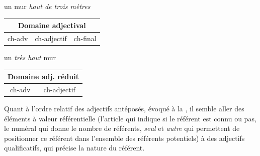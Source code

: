 {    \ea 
    \ea un mur \textit{haut de trois mètres}\\
    \begin{center}
    \def\arraystretch{1.5}
    \setlength{\tabcolsep}{4ex}
    \begin{tabular}{|c|c|c|}
    \hline
    \multicolumn{3}{|c|}{\cellcolor{lsDOIGray}Domaine adjectival}\\\hline
    ch-adv & \cellcolor{lsDOIGray} ch-adjectif & ch-final\\
    \hline
    \end{tabular}
    \end{center}
    
    \ex un \textit{très haut} mur\\
    \begin{center}
    \def\arraystretch{1.5}
    \setlength{\tabcolsep}{4ex}
    \begin{tabular}{|c|c|}
    \hline
    \multicolumn{2}{|c|}{\cellcolor{lsDOIGray}Domaine adj. réduit}\\\hline
    ch-adv & \cellcolor{lsDOIGray}ch-adjectif\\
    \hline
    \end{tabular}
    \end{center}
    \z
    \z

    Quant à l’ordre relatif des adjectifs antéposés, évoqué à la , il semble aller des éléments à valeur référentielle (l’article qui indique si le référent est connu ou pas, le numéral qui donne le nombre de référents, \textit{seul} et \textit{autre} qui permettent de positionner ce référent dans l’ensemble des référents potentiels) à des adjectifs qualificatifs, qui précise la nature du référent.
}
